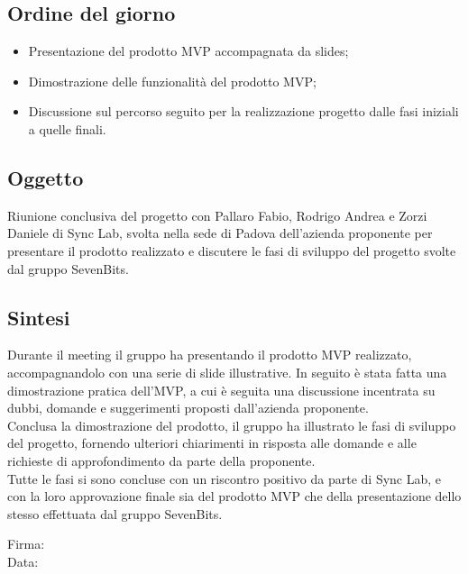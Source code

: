 \documentclass[10pt]{article}
\begin{document}
\subsection{Ordine del giorno}
\begin{itemize}
    \item Presentazione del prodotto MVP accompagnata da slides;
    \item Dimostrazione delle funzionalità del prodotto MVP;
    \item Discussione sul percorso seguito per la realizzazione progetto dalle fasi iniziali a quelle finali.
\end{itemize}

\subsection{Oggetto}
Riunione conclusiva del progetto con Pallaro Fabio, Rodrigo Andrea e Zorzi Daniele di Sync Lab, svolta nella sede di Padova dell'azienda proponente
per presentare il prodotto realizzato e discutere le fasi di sviluppo del progetto svolte dal gruppo SevenBits.

\subsection{Sintesi}
Durante il meeting il gruppo ha presentando il prodotto MVP realizzato, accompagnandolo con una serie di slide illustrative. In seguito è stata fatta una dimostrazione pratica
dell'MVP, a cui è seguita una discussione incentrata su dubbi, domande e suggerimenti proposti dall'azienda proponente.\\
Conclusa la dimostrazione del prodotto, il gruppo ha illustrato le fasi di sviluppo del progetto, fornendo ulteriori chiarimenti in risposta alle domande e alle richieste di approfondimento da parte 
della proponente.\\
Tutte le fasi si sono concluse con un riscontro positivo da parte di Sync Lab, e con la loro approvazione finale sia del prodotto MVP che della presentazione dello stesso
effettuata dal gruppo SevenBits.\\


\vfill
\begin{minipage}{10cm}
Firma: \hrulefill \\
\vspace{2mm}
Data: \dotfill
\end{minipage}
\end{document}
